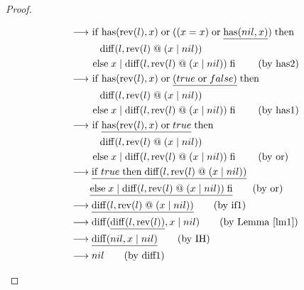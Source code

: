 \documentclass[12pt, a4paper]{article}
\newcommand{\rel}[1]{\mathrel{#1}}
\newcommand{\rmx}[1]{\mathrm{#1}}
\newcommand{\larrow}{\longrightarrow}
\newcommand{\under}{\underline}
\begin{document}
\begin{proof}
\begin{description}
\begin{align*}
	&\larrow\ \rel{\rmx{if}} \rmx{has}(\rmx{rev}(l), x) \rel{\rmx{or}} ((x = x) \rel{\rmx{or}} \under{\rmx{has}(nil, x)}) \rel{\rmx{then}} \\
	&\quad \quad \quad \rmx{diff}(l, \rmx{rev}(l) \rel{@} (x \rel{|} nil)) \\
	&\quad \quad \rel{\rmx{else}} x \rel{|} \rmx{diff}(l, \rmx{rev}(l) \rel{@}(x \rel{|} nil)) \rel{\rmx{fi}} \tag{by has2} \\
	&\larrow\ \rel{\rmx{if}} \rmx{has}(\rmx{rev}(l), x) \rel{\rmx{or}} \under{(true \rel{\rmx{or}} false)} \rel{\rmx{then}} \\
	&\quad \quad \quad \rmx{diff}(l, \rmx{rev}(l) \rel{@} (x \rel{|} nil)) \\
	&\quad \quad \rel{\rmx{else}} x \rel{|} \rmx{diff}(l, \rmx{rev}(l) \rel{@}(x \rel{|} nil)) \rel{\rmx{fi}} \tag{by has1} \\
	&\larrow\ \rel{\rmx{if}} \under{\rmx{has}(\rmx{rev}(l), x) \rel{\rmx{or}} true} \rel{\rmx{then}} \\
	&\quad \quad \quad \rmx{diff}(l, \rmx{rev}(l) \rel{@} (x \rel{|} nil)) \\
	&\quad \quad \rel{\rmx{else}} x \rel{|} \rmx{diff}(l, \rmx{rev}(l) \rel{@}(x \rel{|} nil)) \rel{\rmx{fi}} \tag{by or} \\
	&\larrow \under{\rel{\rmx{if}} true \rel{\rmx{then}} \rmx{diff}(l, \rmx{rev}(l) \rel{@} (x \rel{|} nil))} \\
	&\quad \quad \under{\rel{\rmx{else}} x \rel{|} \rmx{diff}(l, \rmx{rev}(l) \rel{@}(x \rel{|} nil)) \rel{\rmx{fi}}} \tag{by or} \\
	&\larrow \under{\rmx{diff}(l, \rmx{rev}(l) \rel{@} (x \rel{|} nil))} \tag{by if1} \\
	&\larrow \rmx{diff}(\under{\rmx{diff}(l, \rmx{rev}(l))}, x \rel{|} nil) \tag{by Lemma~\ref{lm1}} \\	
&\larrow \under{\rmx{diff}(nil, x \rel{|} nil)} \tag{by IH} \\
&\larrow nil \tag{by diff1}
\end{align*}

\end{description}

\end{proof}
\end{document}
